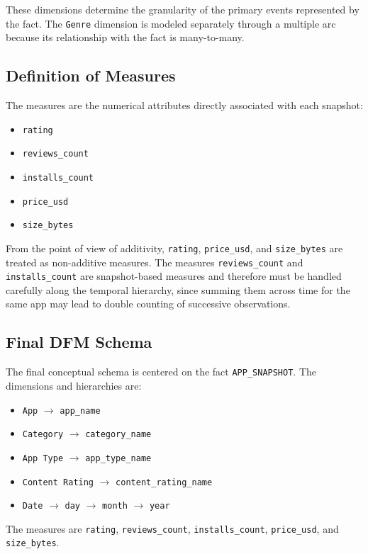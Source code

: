 \documentclass[11pt,a4paper]{article}
\begin{document}
These dimensions determine the granularity of the primary events represented by the fact. The \texttt{Genre} dimension is modeled separately through a multiple arc because its relationship with the fact is many-to-many.

\subsection{Definition of Measures}
The measures are the numerical attributes directly associated with each snapshot:
\begin{itemize}[leftmargin=1.5em]
    \item \texttt{rating}
    \item \texttt{reviews\_count}
    \item \texttt{installs\_count}
    \item \texttt{price\_usd}
    \item \texttt{size\_bytes}
\end{itemize}

From the point of view of additivity, \texttt{rating}, \texttt{price\_usd}, and \texttt{size\_bytes} are treated as non-additive measures. The measures \texttt{reviews\_count} and \texttt{installs\_count} are snapshot-based measures and therefore must be handled carefully along the temporal hierarchy, since summing them across time for the same app may lead to double counting of successive observations.

\subsection{Final DFM Schema}
The final conceptual schema is centered on the fact \texttt{APP\_SNAPSHOT}. The dimensions and hierarchies are:
\begin{itemize}[leftmargin=1.5em]
    \item \texttt{App} $\rightarrow$ \texttt{app\_name}
    \item \texttt{Category} $\rightarrow$ \texttt{category\_name}
    \item \texttt{App Type} $\rightarrow$ \texttt{app\_type\_name}
    \item \texttt{Content Rating} $\rightarrow$ \texttt{content\_rating\_name}
    \item \texttt{Date} $\rightarrow$ \texttt{day} $\rightarrow$ \texttt{month} $\rightarrow$ \texttt{year}
\end{itemize}

The measures are \texttt{rating}, \texttt{reviews\_count}, \texttt{installs\_count}, \texttt{price\_usd}, and \texttt{size\_bytes}.
\end{document}
